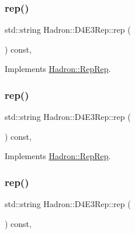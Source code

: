 \subsubsection{\texorpdfstring{rep()}{rep()}\hspace{0.1cm}{\footnotesize\ttfamily [3/5]}}
{\footnotesize\ttfamily std\+::string Hadron\+::\+D4\+E3\+Rep\+::rep (\begin{DoxyParamCaption}{ }\end{DoxyParamCaption}) const\hspace{0.3cm}{\ttfamily [inline]}, {\ttfamily [virtual]}}



Implements \mbox{\hyperlink{structHadron_1_1RepRep_ab3213025f6de249f7095892109575fde}{Hadron\+::\+Rep\+Rep}}.

\mbox{\label{structHadron_1_1D4E3Rep_aee1429ccf3e674cb3d5bad78d15a0e33}} 
\subsubsection{\texorpdfstring{rep()}{rep()}\hspace{0.1cm}{\footnotesize\ttfamily [4/5]}}
{\footnotesize\ttfamily std\+::string Hadron\+::\+D4\+E3\+Rep\+::rep (\begin{DoxyParamCaption}{ }\end{DoxyParamCaption}) const\hspace{0.3cm}{\ttfamily [inline]}, {\ttfamily [virtual]}}



Implements \mbox{\hyperlink{structHadron_1_1RepRep_ab3213025f6de249f7095892109575fde}{Hadron\+::\+Rep\+Rep}}.

\mbox{\label{structHadron_1_1D4E3Rep_aee1429ccf3e674cb3d5bad78d15a0e33}} 
\subsubsection{\texorpdfstring{rep()}{rep()}\hspace{0.1cm}{\footnotesize\ttfamily [5/5]}}
{\footnotesize\ttfamily std\+::string Hadron\+::\+D4\+E3\+Rep\+::rep (\begin{DoxyParamCaption}{ }\end{DoxyParamCaption}) const\hspace{0.3cm}{\ttfamily [inline]}, {\ttfamily [virtual]}}



